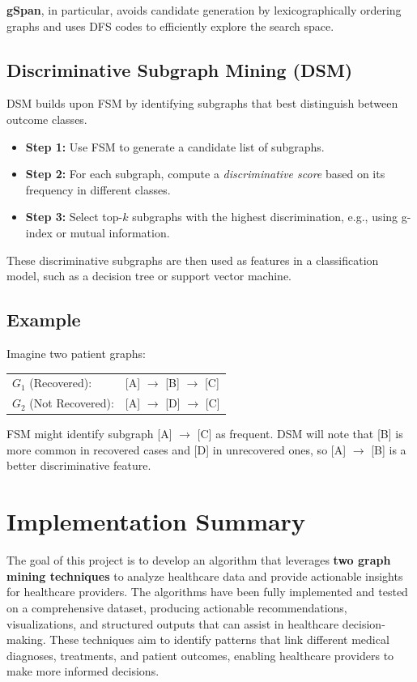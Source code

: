\documentclass[11pt]{article}
\begin{document}
\textbf{gSpan}, in particular, avoids candidate generation by lexicographically ordering graphs and uses DFS codes to efficiently explore the search space.

\subsection*{Discriminative Subgraph Mining (DSM)}
DSM builds upon FSM by identifying subgraphs that best distinguish between outcome classes.

\begin{itemize}
    \item \textbf{Step 1:} Use FSM to generate a candidate list of subgraphs.
    \item \textbf{Step 2:} For each subgraph, compute a \textit{discriminative score} based on its frequency in different classes.
    \item \textbf{Step 3:} Select top-$k$ subgraphs with the highest discrimination, e.g., using g-index or mutual information.
\end{itemize}

These discriminative subgraphs are then used as features in a classification model, such as a decision tree or support vector machine.

\subsection*{Example}
Imagine two patient graphs:

\vspace{0.3em}
\begin{tabular}{ll}
$G_1$ (Recovered): & [A] $\rightarrow$ [B] $\rightarrow$ [C] \\
$G_2$ (Not Recovered): & [A] $\rightarrow$ [D] $\rightarrow$ [C]
\end{tabular}

\vspace{0.3em}
FSM might identify subgraph [A] $\rightarrow$ [C] as frequent. DSM will note that [B] is more common in recovered cases and [D] in unrecovered ones, so [A] $\rightarrow$ [B] is a better discriminative feature.

\vspace{0.3em}



\section{Implementation Summary}
The goal of this project is to develop an algorithm that leverages \textbf{two graph mining techniques} to analyze healthcare data and provide actionable insights for healthcare providers. The algorithms have been fully implemented and tested on a comprehensive dataset, producing actionable recommendations, visualizations, and structured outputs that can assist in healthcare decision-making. These techniques aim to identify patterns that link different medical diagnoses, treatments, and patient outcomes, enabling healthcare providers to make more informed decisions.
\end{document}
